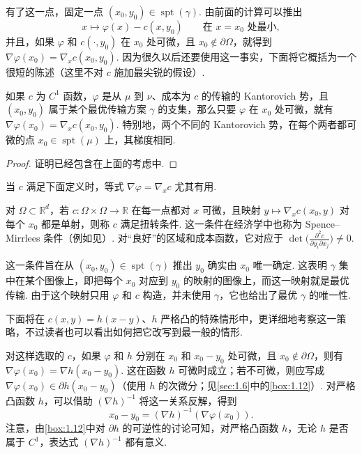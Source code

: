 有了这一点，固定一点 $(x_0,y_0)\in\operatorname{spt}(\gamma)$. 由前面的计算可以推出
\[
x\mapsto\varphi(x)-c(x,y_0)\qquad\text{在 }x=x_0\text{ 处最小},
\]
并且，如果 $\varphi$ 和 $c(\cdot,y_0)$ 在 $x_0$ 处可微，且 $x_0\notin\partial\Omega$，就得到 $\nabla\varphi(x_0)=\nabla_x c(x_0,y_0)$. 因为很久以后还要使用这一事实，下面将它概括为一个很短的陈述（这里不对 $c$ 施加最尖锐的假设）.

\begin{proposition}\label{obj:1.15}
如果 $c$ 为 $C^1$ 函数，$\varphi$ 是从 $\mu$ 到 $\nu$、成本为 $c$ 的传输的 Kantorovich 势，且 $(x_0,y_0)$ 属于某个最优传输方案 $\gamma$ 的支集，那么只要 $\varphi$ 在 $x_0$ 处可微，就有 $\nabla\varphi(x_0)=\nabla_x c(x_0,y_0)$. 特别地，两个不同的 Kantorovich 势，在每个两者都可微的点 $x_0\in\operatorname{spt}(\mu)$ 上，其梯度相同.
\end{proposition}
\begin{proof}
证明已经包含在上面的考虑中.
\end{proof}

当 $c$ 满足下面定义时，等式 $\nabla\varphi=\nabla_x c$ 尤其有用.

\begin{definition}\label{obj:1.16}
对 $\Omega\subset\mathbb R^d$，若 $c:\Omega\times\Omega\to\mathbb R$ 在每一点都对 $x$ 可微，且映射 $y\mapsto\nabla_x c(x_0,y)$ 对每个 $x_0$ 都是单射，则称 $c$ 满足扭转条件. 这一条件在经济学中也称为 Spence--Mirrlees 条件（例如见\cite{b261}）. 对“良好”的区域和成本函数，它对应于 $\det\bigl(\frac{\partial^2c}{\partial y_i\partial x_j}\bigr)\ne0$.
\end{definition}

这一条件旨在从 $(x_0,y_0)\in\operatorname{spt}(\gamma)$ 推出 $y_0$ 确实由 $x_0$ 唯一确定. 这表明 $\gamma$ 集中在某个图像上，即把每个 $x_0$ 对应到 $y_0$ 的映射的图像上，而这一映射就是最优传输. 由于这个映射只用 $\varphi$ 和 $c$ 构造，并未使用 $\gamma$，它也给出了最优 $\gamma$ 的唯一性.

下面将在 $c(x,y)=h(x-y)$、$h$ 严格凸的特殊情形中，更详细地考察这一策略，不过读者也可以看出如何把它改写到最一般的情形.

对这样选取的 $c$，如果 $\varphi$ 和 $h$ 分别在 $x_0$ 和 $x_0-y_0$ 处可微，且 $x_0\notin\partial\Omega$，则有 $\nabla\varphi(x_0)=\nabla h(x_0-y_0)$. 这在函数 $h$ 可微时成立；若不可微，则应写成 $\nabla\varphi(x_0)\in\partial h(x_0-y_0)$（使用 $h$ 的次微分；见\autoref{sec:1.6}中的\autoref{box:1.12}）. 对严格凸函数 $h$，可以借助 $(\nabla h)^{-1}$ 将这一关系反解，得到
\[
x_0-y_0=(\nabla h)^{-1}(\nabla\varphi(x_0)).
\]
注意，由\autoref{box:1.12}中对 $\partial h$ 的可逆性的讨论可知，对严格凸函数 $h$，无论 $h$ 是否属于 $C^1$，表达式 $(\nabla h)^{-1}$ 都有意义.

